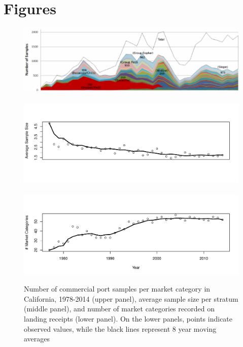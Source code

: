 \documentclass[12pt]{article}
\begin{document}
%
\clearpage
%

% 
% 
\section{Figures} 
% 
% 

\begin{figure}[h!]
\centering
\includegraphics[width=\textwidth]{./pictures/mcatColors.png}
$~$\\
\vspace*{-2cm}
\hspace*{-0.3cm}
\includegraphics[width=1.055\textwidth]{./pictures/stratAvgSamp.pdf}
$~$\\
\vspace*{-3.8cm}
\hspace*{-0.3cm}
\includegraphics[width=1.055\textwidth]{./pictures/nMcatsEMA.pdf}
\caption{Number of commercial port samples per market
category in California, 1978-2014 (upper panel), average sample size per
stratum (middle panel), and number of market categories recorded on
landing receipts (lower panel). On the lower panels, points indicate
observed values, while the black lines represent 8 year moving averages}
\label{sparceData}
\end{figure}
\end{document}

